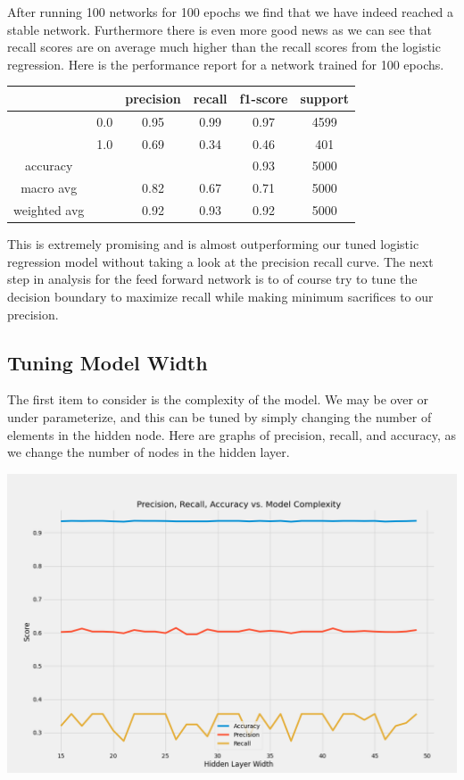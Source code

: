 \documentclass[12pt]{article}
\begin{document}
	After running 100 networks for 100 epochs we find that we have indeed reached a stable network. Furthermore there is even more good news as we can see that recall scores are on average much higher than the recall scores from the logistic regression. Here is the performance report for a network trained for 100 epochs. 
	
	\begin{tabular}{c|c|c|c|c|c}
		\hline
		& 		& 	precision &  recall  & f1-score   & support \\ \hline
		
		&  0.0	&		0.95 &     0.99   &  0.97   &  4599 \\ \hline
		&  1.0  &		0.69 &     0.34   &  0.46   &   401 \\ \hline
		
		accuracy    & & & &                       		  0.93   &   5000 \\ \hline
		macro avg   & &   			0.82   &   0.67  &    0.71   &   5000  \\ \hline
		weighted avg  & &   		0.92   &   0.93  &    0.92   &   5000 \\ \hline
	\end{tabular}
	
	This is extremely promising and is almost outperforming our tuned logistic regression model without taking a look at the precision recall curve. The next step in analysis for the feed forward network is to of course try to tune the decision boundary to maximize recall while making minimum sacrifices to our precision. 
	
	\subsection{Tuning Model Width}
	
	
	The first item to consider is the complexity of the model. We may be over or under parameterize, and this can be tuned by simply changing the number of elements in the hidden node. Here are graphs of precision, recall, and accuracy, as we change the number of nodes in the hidden layer. 
	
	
	\includegraphics[scale=0.4]{../notebooks/nn_width.png}
	
\end{document}

